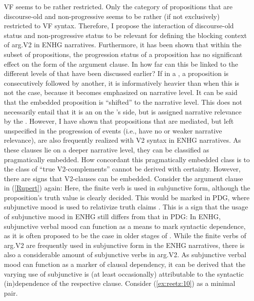 \documentclass[output=paper,colorlinks,citecolor=brown]{langscibook}
\begin{document}
VF seems to be rather restricted. Only the category of propositions that are discourse-old and non-progressive seems to be rather (if not exclusively) restricted to VF syntax. Therefore, I propose the interaction of discourse-old status and non-progressive status to be relevant for defining the blocking context of arg.V2 in ENHG narratives. Furthermore, it has been shown that within the subset of  propositions, the progression status of a proposition has no significant effect on the form of the argument clause. In how far can this be linked to the different levels of  that have been discussed earlier? If in a , a proposition is consecutively followed by another, it is informatively heavier than when this is not the case, because it becomes emphasized on narrative level. It can be said that the embedded proposition is “shifted” to the narrative level. This does not necessarily entail that it is an  on the 's side, but is assigned narrative relevance by the . However, I have shown that propositions that are mediated, but left unspecified in the progression of events (i.e., have no or weaker narrative relevance), are also frequently realized with V2 syntax in ENHG narratives. As these clauses lie on a deeper narrative level, they can be classified as pragmatically embedded. How concordant this pragmatically embedded class is to the class of “true V2-complements” \citep{Freywald2016} cannot be derived with certainty. However, there are signs that V2-clauses can be embedded. Consider the argument clause in (\ref{Rupert}) again: Here, the finite verb is used in subjunctive form, although the proposition's truth value is clearly decided. This would be marked in PDG, where subjunctive mood is used to relativize truth claims \citep{Fabricius-Hansen2019}. This is a sign that the usage of subjunctive mood in ENHG still differs from that in PDG: In ENHG, subjunctive verbal mood can function as a means to mark syntactic dependence, as it is often proposed to be the case in older stages of  \citep{Schrodt2004}. While the finite verbs of arg.V2 are frequently used in subjunctive form in the ENHG narratives, there is also a considerable amount of subjunctive verbs in arg.V2. As subjunctive verbal mood can function as a marker of clausal dependency, it can be derived that the varying use of subjunctive is (at least occasionally) attributable to the syntactic (in)dependence of the respective clause. Consider (\ref{ex:reetz:10}) as a minimal pair.
\end{document}

